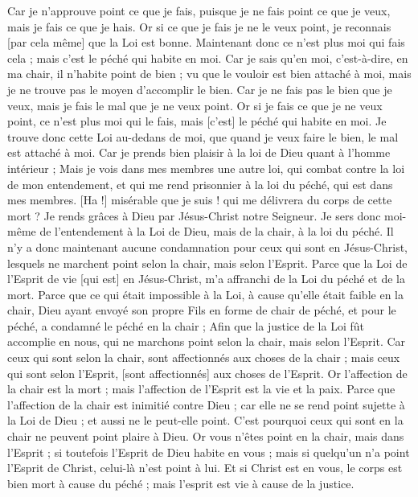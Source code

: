 \begin{multicols}{2}
Car je n'approuve point ce que je fais, puisque je ne fais point ce que je veux, mais je fais ce que je hais.
Or si ce que je fais je ne le veux point, je reconnais [par cela même] que la Loi est bonne.
Maintenant donc ce n'est plus moi qui fais cela ; mais c'est le péché qui habite en moi.
Car je sais qu'en moi, c'est-à-dire, en ma chair, il n'habite point de bien ; vu que le vouloir est bien attaché à moi, mais je ne trouve pas le moyen d'accomplir le bien.
Car je ne fais pas le bien que je veux, mais je fais le mal que je ne veux point.
Or si je fais ce que je ne veux point, ce n'est plus moi qui le fais, mais [c'est] le péché qui habite en moi.
Je trouve donc cette Loi au-dedans de moi, que quand je veux faire le bien, le mal est attaché à moi.
Car je prends bien plaisir à la loi de Dieu quant à l'homme intérieur ;
Mais je vois dans mes membres une autre loi, qui combat contre la loi de mon entendement, et qui me rend prisonnier à la loi du péché, qui est dans mes membres.
[Ha !] misérable que je suis ! qui me délivrera du corps de cette mort ?
Je rends grâces à Dieu par Jésus-Christ notre Seigneur. Je sers donc moi-même de l'entendement à la Loi de Dieu, mais de la chair, à la loi du péché.
\VerseOne{}Il n'y a donc maintenant aucune condamnation pour ceux qui sont en Jésus-Christ, lesquels ne marchent point selon la chair, mais selon l'Esprit.
Parce que la Loi de l'Esprit de vie [qui est] en Jésus-Christ, m'a affranchi de la Loi du péché et de la mort.
Parce que ce qui était impossible à la Loi, à cause qu'elle était faible en la chair, Dieu ayant envoyé son propre Fils en forme de chair de péché, et pour le péché, a condamné le péché en la chair ;
Afin que la justice de la Loi fût accomplie en nous, qui ne marchons point selon la chair, mais selon l'Esprit.
Car ceux qui sont selon la chair, sont affectionnés aux choses de la chair ; mais ceux qui sont selon l'Esprit, [sont affectionnés] aux choses de l'Esprit.
Or l'affection de la chair est la mort ; mais l'affection de l'Esprit est la vie et la paix.
Parce que l'affection de la chair est inimitié contre Dieu ; car elle ne se rend point sujette à la Loi de Dieu ; et aussi ne le peut-elle point.
C'est pourquoi ceux qui sont en la chair ne peuvent point plaire à Dieu.
Or vous n'êtes point en la chair, mais dans l'Esprit ; si toutefois l'Esprit de Dieu habite en vous ; mais si quelqu'un n'a point l'Esprit de Christ, celui-là n'est point à lui.
Et si Christ est en vous, le corps est bien mort à cause du péché ; mais l'esprit est vie à cause de la justice.

\end{multicols}
